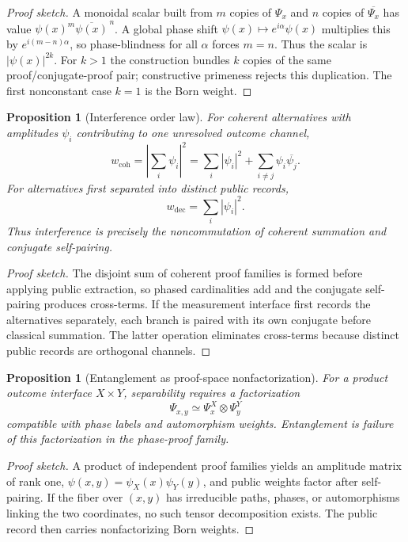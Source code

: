 \documentclass[11pt]{article}
\theoremstyle{plain}
\newtheorem{proposition}[theorem]{Proposition}
\theoremstyle{definition}
\theoremstyle{remark}
\newenvironment{proofsketch}{\begin{proof}[Proof sketch]}{\end{proof}}
\begin{document}
\begin{proofsketch}
A monoidal scalar built from \(m\) copies of \(\Psi_x\) and \(n\) copies of \(\overline{\Psi_x}\) has value \(\psi(x)^m\overline{\psi(x)}^{\,n}\). A global phase shift \(\psi(x)\mapsto e^{i\alpha}\psi(x)\) multiplies this by \(e^{i(m-n)\alpha}\), so phase-blindness for all \(\alpha\) forces \(m=n\). Thus the scalar is \(|\psi(x)|^{2k}\). For \(k>1\) the construction bundles \(k\) copies of the same proof/conjugate-proof pair; constructive primeness rejects this duplication. The first nonconstant case \(k=1\) is the Born weight.
\end{proofsketch}

\begin{proposition}[Interference order law]
For coherent alternatives with amplitudes \(\psi_i\) contributing to one unresolved outcome channel,
\[
w_{\mathrm{coh}}
=
\left|\sum_i\psi_i\right|^2
=
\sum_i|\psi_i|^2+\sum_{i\ne j}\psi_i\overline{\psi_j}.
\]
For alternatives first separated into distinct public records,
\[
w_{\mathrm{dec}}=\sum_i|\psi_i|^2.
\]
Thus interference is precisely the noncommutation of coherent summation and conjugate self-pairing.
\end{proposition}

\begin{proofsketch}
The disjoint sum of coherent proof families is formed before applying public extraction, so phased cardinalities add and the conjugate self-pairing produces cross-terms. If the measurement interface first records the alternatives separately, each branch is paired with its own conjugate before classical summation. The latter operation eliminates cross-terms because distinct public records are orthogonal channels.
\end{proofsketch}

\begin{proposition}[Entanglement as proof-space nonfactorization]
For a product outcome interface \(X\times Y\), separability requires a factorization
\[
\Psi_{x,y}\simeq \Psi^X_x\otimes\Psi^Y_y
\]
compatible with phase labels and automorphism weights. Entanglement is failure of this factorization in the phase-proof family.
\end{proposition}

\begin{proofsketch}
A product of independent proof families yields an amplitude matrix of rank one, \(\psi(x,y)=\psi_X(x)\psi_Y(y)\), and public weights factor after self-pairing. If the fiber over \((x,y)\) has irreducible paths, phases, or automorphisms linking the two coordinates, no such tensor decomposition exists. The public record then carries nonfactorizing Born weights.
\end{proofsketch}
\end{document}
